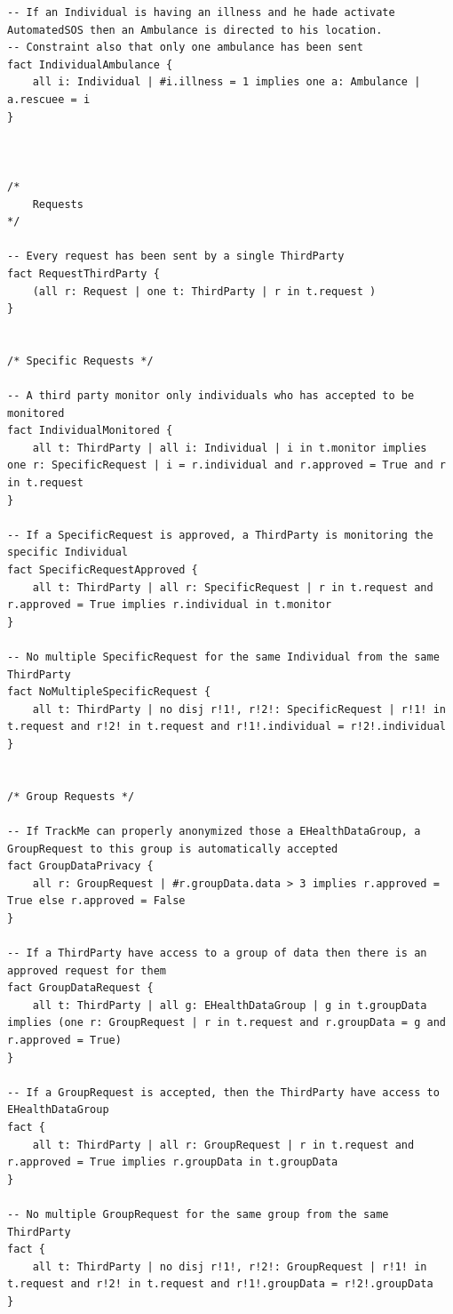 \begin{lstlisting}
-- If an Individual is having an illness and he hade activate AutomatedSOS then an Ambulance is directed to his location.
-- Constraint also that only one ambulance has been sent
fact IndividualAmbulance {
	all i: Individual | #i.illness = 1 implies one a: Ambulance | a.rescuee = i
}



/*
	Requests
*/

-- Every request has been sent by a single ThirdParty
fact RequestThirdParty {
	(all r: Request | one t: ThirdParty | r in t.request ) 
}


/* Specific Requests */

-- A third party monitor only individuals who has accepted to be monitored
fact IndividualMonitored {
	all t: ThirdParty | all i: Individual | i in t.monitor implies 		one r: SpecificRequest | i = r.individual and r.approved = True and r in t.request
}

-- If a SpecificRequest is approved, a ThirdParty is monitoring the specific Individual
fact SpecificRequestApproved {
	all t: ThirdParty | all r: SpecificRequest | r in t.request and r.approved = True implies r.individual in t.monitor
}

-- No multiple SpecificRequest for the same Individual from the same ThirdParty
fact NoMultipleSpecificRequest {
	all t: ThirdParty | no disj r!1!, r!2!: SpecificRequest | r!1! in t.request and r!2! in t.request and r!1!.individual = r!2!.individual
}


/* Group Requests */

-- If TrackMe can properly anonymized those a EHealthDataGroup, a GroupRequest to this group is automatically accepted
fact GroupDataPrivacy {
	all r: GroupRequest | #r.groupData.data > 3 implies r.approved = True else r.approved = False
}

-- If a ThirdParty have access to a group of data then there is an approved request for them
fact GroupDataRequest {
	all t: ThirdParty | all g: EHealthDataGroup | g in t.groupData implies (one r: GroupRequest | r in t.request and r.groupData = g and r.approved = True)
}

-- If a GroupRequest is accepted, then the ThirdParty have access to EHealthDataGroup
fact {
	all t: ThirdParty | all r: GroupRequest | r in t.request and r.approved = True implies r.groupData in t.groupData
}

-- No multiple GroupRequest for the same group from the same ThirdParty
fact {
	all t: ThirdParty | no disj r!1!, r!2!: GroupRequest | r!1! in t.request and r!2! in t.request and r!1!.groupData = r!2!.groupData
}





\end{lstlisting}
